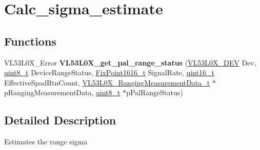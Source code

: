 \hypertarget{group__calc__sigma__estimate}{}\section{Calc\+\_\+sigma\+\_\+estimate}
\label{group__calc__sigma__estimate}
\subsection*{Functions}
\begin{DoxyCompactItemize}
\item 
\mbox{\label{group__calc__sigma__estimate_gac7b145a42321621d506540b81b33ceb6}} 
V\+L53\+L0\+X\+\_\+\+Error {\bfseries V\+L53\+L0\+X\+\_\+get\+\_\+pal\+\_\+range\+\_\+status} (\hyperlink{group__VL53L0X__platform__group_ga2d6405308b1dd524b462f1b8fb97d167}{V\+L53\+L0\+X\+\_\+\+D\+EV} Dev, \hyperlink{vl53l0x__types_8h_aba7bc1797add20fe3efdf37ced1182c5}{uint8\+\_\+t} Device\+Range\+Status, \hyperlink{vl53l0x__types_8h_afb910790161809fc76e1a274a6349384}{Fix\+Point1616\+\_\+t} Signal\+Rate, \hyperlink{vl53l0x__types_8h_a273cf69d639a59973b6019625df33e30}{uint16\+\_\+t} Effective\+Spad\+Rtn\+Count, \hyperlink{structVL53L0X__RangingMeasurementData__t}{V\+L53\+L0\+X\+\_\+\+Ranging\+Measurement\+Data\+\_\+t} $\ast$p\+Ranging\+Measurement\+Data, \hyperlink{vl53l0x__types_8h_aba7bc1797add20fe3efdf37ced1182c5}{uint8\+\_\+t} $\ast$p\+Pal\+Range\+Status)
\end{DoxyCompactItemize}


\subsection{Detailed Description}
Estimates the range sigma